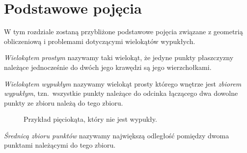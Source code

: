 \chapter{Podstawowe pojęcia}\label{chap:pojecia}
W tym rozdziale zostaną przybliżone podstawowe pojęcia związane
z geometrią obliczeniową i problemami dotyczącymi wielokątów
wypukłych.

\begin{definicja}
  \emph{Wielokątem prostym} nazywamy taki wielokąt, że jedyne punkty
  płaszczyzny należące jednocześnie do dwóch jego krawędzi są jego
  wierzchołkami.
\end{definicja}

\begin{definicja}
  \emph{Wielokątem wypukłym} nazywamy wielokąt prosty którego wnętrze
  jest \emph{zbiorem wypukłym}, tzn.\ wszystkie punkty należące do
  odcinka łączącego dwa dowolne punkty ze zbioru należą do tego
  zbioru.
\end{definicja}


\begin{figure}[htb]
  \centering
  \caption{Przykład pięciokąta, który nie jest wypukły.}
\end{figure}

\begin{definicja}
  \emph{Średnicą zbioru punktów} nazywamy największą odległość
  pomiędzy dwoma punktami należącymi do tego zbioru.
\end{definicja}

